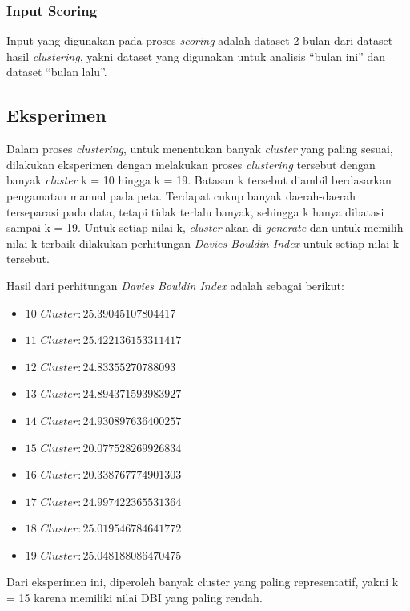 \documentclass{article}
\begin{document}
\subsubsection{Input Scoring}

\begin{adjustwidth}{4em}{0pt}
	
	\hspace{\parindent}Input yang digunakan pada proses \textit{scoring} adalah dataset 2 bulan dari dataset hasil \textit{clustering}, yakni dataset yang digunakan untuk analisis ``bulan ini'' dan dataset ``bulan lalu''.
	
	
\end{adjustwidth}

\subsection{Eksperimen}

\begin{adjustwidth}{2em}{0pt}
	
\hspace{\parindent}Dalam proses \textit{clustering}, untuk menentukan banyak \textit{cluster} yang paling sesuai, dilakukan eksperimen dengan melakukan proses \textit{clustering} tersebut dengan banyak \textit{cluster} k = 10 hingga k = 19. Batasan k tersebut diambil berdasarkan pengamatan manual pada peta. Terdapat cukup banyak daerah-daerah terseparasi pada data, tetapi tidak terlalu banyak, sehingga k hanya dibatasi sampai k = 19. Untuk setiap nilai k, \textit{cluster} akan di-\textit{generate} dan untuk memilih nilai k terbaik dilakukan perhitungan \textit{Davies Bouldin Index} untuk setiap nilai k tersebut.

Hasil dari perhitungan \textit{Davies Bouldin Index} adalah sebagai berikut: 

\begin{itemize}
	\item{$10$ $Cluster : 25.39045107804417$}
	\item{$11$ $Cluster : 25.422136153311417$}
	\item{$12$ $Cluster : 24.83355270788093$}
	\item{$13$ $Cluster : 24.894371593983927$}
	\item{$14$ $Cluster : 24.930897636400257$}
	\item{$15$ $Cluster : 20.077528269926834$}
	\item{$16$ $Cluster : 20.338767774901303$}
	\item{$17$ $Cluster : 24.997422365531364$}
	\item{$18$ $Cluster : 25.019546784641772$}
	\item{$19$ $Cluster : 25.048188086470475$}	
\end{itemize}

Dari eksperimen ini, diperoleh banyak cluster yang paling representatif, yakni k = 15 karena memiliki nilai DBI yang paling rendah.

\end{adjustwidth}
\end{document}
